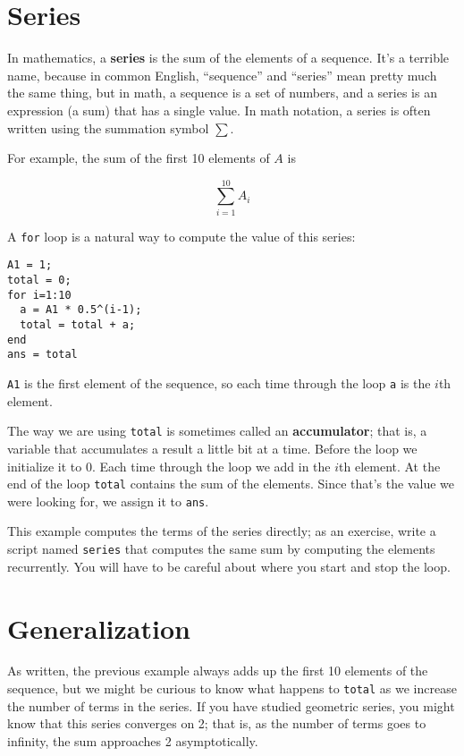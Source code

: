 \section{Series}
\label{series}

In mathematics, a {\bf series} is the sum of the elements of
a sequence. It's a terrible name, because in common English,
``sequence'' and ``series'' mean pretty much the same thing, but in
math, a sequence is a set of numbers, and a series is an expression
(a sum) that has a single value. In math notation, a series
is often written using the summation symbol $\sum$.

For example, the sum of the first 10 elements of $A$ is

\[ \sum_{i=1}^{10} A_i \]

A {\tt for} loop is a natural way to compute the value of this
series:

\begin{verbatim}
A1 = 1;
total = 0;
for i=1:10
  a = A1 * 0.5^(i-1);
  total = total + a;
end
ans = total
\end{verbatim}

{\tt A1} is the first element of the sequence, so each time
through the loop {\tt a} is the $i$th element. 

The way we are using {\tt total} is sometimes called an {\bf
accumulator}; that is, a variable that accumulates a result a little
bit at a time. Before the loop we initialize it to 0. Each time
through the loop we add in the $i$th element. At the end of the loop
{\tt total} contains the sum of the elements. Since that's the value
we were looking for, we assign it to {\tt ans}.

\begin{ex}
This example computes the terms of the series directly; as
an exercise, write a script named {\tt series} that computes
the same sum by computing the elements recurrently. You will
have to be careful about where you start and stop the loop.
\end{ex}


\section{Generalization}

As written, the previous example always adds up the first 10
elements of the sequence, but we might be curious to know what
happens to {\tt total} as we increase the
number of terms in the series. If you have studied geometric
series, you might know that this series converges on 2; that is,
as the number of terms goes to infinity, the sum approaches
2 asymptotically.

